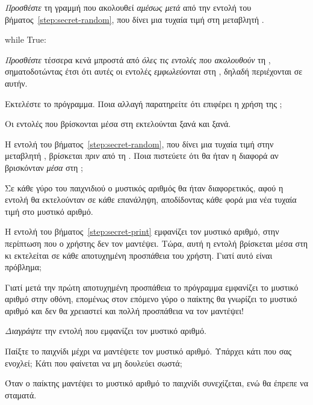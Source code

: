 \documentclass[a4paper,11pt,oneside]{book}
\begin{document}
\begin{step}
\emph{Προσθέστε} τη γραμμή που ακολουθεί \emph{αμέσως μετά} από την εντολή του βήματος~\ref{step:secret-random}, που δίνει μια τυχαία τιμή στη μεταβλητή .

\begin{pynew}
while True:
\end{pynew}

\emph{Προσθέστε} τέσσερα κενά μπροστά από \emph{όλες τις εντολές που ακολουθούν} τη , σηματοδοτώντας έτσι ότι αυτές οι εντολές \emph{εμφωλεύονται} στη , δηλαδή περιέχονται σε αυτήν.

Εκτελέστε το πρόγραμμα. 
Ποια αλλαγή παρατηρείτε ότι επιφέρει η χρήση της ;

\begin{answer}
Οι εντολές που βρίσκονται μέσα στη  εκτελούνται ξανά και ξανά.
\end{answer}

Η εντολή του βήματος~\ref{step:secret-random}, που δίνει μια τυχαία τιμή στην μεταβλητή , βρίσκεται \emph{πριν} από τη . Ποια πιστεύετε ότι θα ήταν η διαφορά αν βρισκόνταν \emph{μέσα} στη ;

\begin{answer}
Σε κάθε γύρο του παιχνιδιού ο μυστικός αριθμός θα ήταν διαφορετικός, αφού η εντολή  θα εκτελούνταν σε κάθε επανάληψη, αποδίδοντας κάθε φορά μια νέα τυχαία τιμή στο μυστικό αριθμό.
\end{answer}

\label{step:secret-print-remove}
Η εντολή του βήματος~\ref{step:secret-print} εμφανίζει τον μυστικό αριθμό, στην περίπτωση που ο χρήστης δεν τον μαντέψει. Τώρα, αυτή η εντολή βρίσκεται μέσα στη  κι εκτελείται σε κάθε αποτυχημένη προσπάθεια του χρήστη. Γιατί αυτό είναι πρόβλημα;

\begin{answer}
Γιατί μετά την πρώτη αποτυχημένη προσπάθεια το πρόγραμμα εμφανίζει το μυστικό αριθμό στην οθόνη, επομένως στον επόμενο γύρο ο παίκτης θα γνωρίζει το μυστικό αριθμό και δεν θα χρειαστεί και πολλή προσπάθεια να τον μαντέψει!
\end{answer}

\emph{Διαγράψτε} την εντολή που εμφανίζει τον μυστικό αριθμό.

Παίξτε το παιχνίδι μέχρι να μαντέψετε τον μυστικό αριθμό. Υπάρχει κάτι που σας ενοχλεί; Κάτι που φαίνεται να μη δουλεύει σωστά;

\begin{answer}
Όταν ο παίκτης μαντέψει το μυστικό αριθμό το παιχνίδι συνεχίζεται, ενώ θα έπρεπε να σταματά.
\end{answer}
\end{step}
\end{document}
